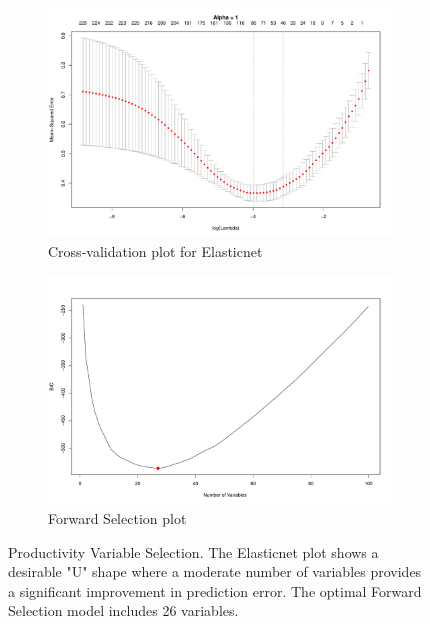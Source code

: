 \documentclass{article}
\begin{document}
\begin{figure}[h]
\begin{subfigure}[b]{0.5\textwidth}
\includegraphics[width=\textwidth]{elastic_cv_production.pdf}
\caption{Cross-validation plot for Elasticnet}
\end{subfigure}
\hfill
\begin{subfigure}[b]{0.5\textwidth}
\includegraphics[width=\textwidth]{forward_nvars_production.pdf}
\caption{Forward Selection plot}
\end{subfigure}
\caption{Productivity Variable Selection. The Elasticnet plot shows a desirable "U" shape where a moderate number of variables provides a significant improvement in prediction error. The optimal Forward Selection model includes 26 variables.}
\label{figure:prod_opt}
\end{figure}
\end{document}
